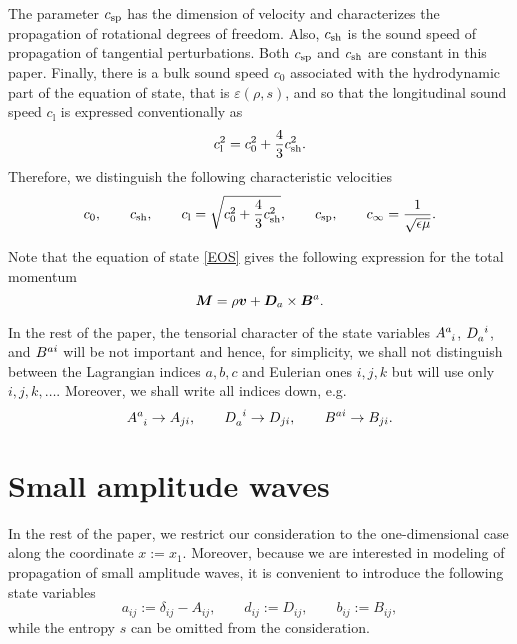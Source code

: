 \documentclass[
10pt, %
a4paper, %
oneside, %
headinclude,footinclude, %
table
]{scrartcl}
\begin{document}
The parameter $ c_\text{sp} $ has the dimension of velocity and characterizes 
the propagation of rotational degrees of freedom. Also, $ c_\text{sh} $ is the sound 
speed of propagation of tangential perturbations. Both $ c_\text{sp} $ and $ c_\text{sh} $ 
are constant in this paper. Finally, there is a bulk 
sound speed $ c_0 $ associated with the hydrodynamic part of the equation of 
state, that is $ \varepsilon(\rho,s) $, and so that the longitudinal sound 
speed $ c_\text{l} $ is expressed conventionally as
\begin{equation}\label{long.sound}
c_\text{l}^2 = c_0^2 + \frac43 c_\text{sh}^2. 
\end{equation}
Therefore, we distinguish the following  characteristic velocities
\begin{equation}\label{velocity.all}
c_0, \qquad c_\text{sh}, \qquad c_\text{l} = \sqrt{c_0^2 + \frac43 c_\text{sh}^2}, 
\qquad c_\text{sp}, \qquad c_\infty = \frac{1}{\sqrt{\epsilon\mu}}.
\end{equation}

Note that the equation of state \eqref{EOS} gives the following expression for 
the total momentum 
\begin{equation}\label{momentum.total}
\bm{M} =\rho \bm{v} + \bm{D}_a\times\bm{B}^a.
\end{equation}

In the rest of the paper, the tensorial character of the state variables $ \dist{a}{i} $, $ 
\durg{a}{i} $, and $ B^{{a}{i}} $ will be not important and hence, for simplicity, we shall not 
distinguish between the Lagrangian indices $ a,b,c $ and Eulerian ones $ i,j,k $ but will use only 
$ 
i,j,k, \ldots $. Moreover, we shall write all indices down, e.g. 
\begin{equation}\label{notations}
\dist{a}{i} \to A_{ji}, \qquad \durg{a}{i} \to D_{ji}, \qquad \burg{a}{i} \to B_{ji}.
\end{equation}



\section{Small amplitude waves}

In 
the rest of the paper, we restrict our consideration to the one-dimensional case along the 
coordinate $ x:=x_1 $. Moreover, because we are interested in modeling of propagation of small 
amplitude waves, it is convenient to introduce the following state variables
\begin{equation}\label{key}
a_{ij} := \delta_{ij} - A_{ij}, \qquad d_{ij} := D_{ij}, \qquad b_{ij} := B_{ij},
\end{equation}
while the entropy $ s $ can be omitted from the consideration. 
\end{document}
